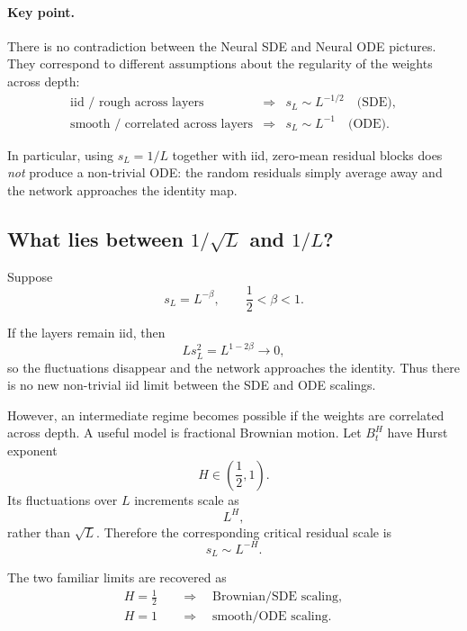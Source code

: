 \paragraph{Key point.}
There is no contradiction between the Neural SDE and Neural ODE
pictures.  They correspond to different assumptions about the
regularity of the weights across depth:
\begin{equation}
\boxed{
\begin{array}{ccl}
\text{iid / rough across layers}
&\Longrightarrow&
s_L\sim L^{-1/2}
\quad\text{(SDE)},
\\[1mm]
\text{smooth / correlated across layers}
&\Longrightarrow&
s_L\sim L^{-1}
\quad\text{(ODE)}.
\end{array}
}
\end{equation}

In particular, using \(s_L=1/L\) together with iid,
zero-mean residual blocks does \emph{not} produce a non-trivial
ODE: the random residuals simply average away and the network
approaches the identity map.


\subsection{What lies between \(1/\sqrt{L}\) and \(1/L\)?}

Suppose
\begin{equation}
    s_L=L^{-\beta},
    \qquad
    \frac12<\beta<1.
\end{equation}

If the layers remain iid, then
\begin{equation}
    Ls_L^2
    =
    L^{1-2\beta}
    \rightarrow0,
\end{equation}
so the fluctuations disappear and the network approaches the
identity.  Thus there is no new non-trivial iid limit between
the SDE and ODE scalings.

However, an intermediate regime becomes possible if the weights
are correlated across depth.  A useful model is fractional
Brownian motion.  Let \(B_t^H\) have Hurst exponent
\[
H\in\left(\frac12,1\right).
\]
Its fluctuations over \(L\) increments scale as
\[
L^H,
\]
rather than \(\sqrt{L}\).  Therefore the corresponding critical
residual scale is
\begin{equation}
    \boxed{
        s_L\sim L^{-H}.
    }
\end{equation}

The two familiar limits are recovered as
\begin{align}
    H=\frac12
    &\quad\Longrightarrow\quad
    \text{Brownian/SDE scaling},
    \\
    H=1
    &\quad\Longrightarrow\quad
    \text{smooth/ODE scaling}.
\end{align}

